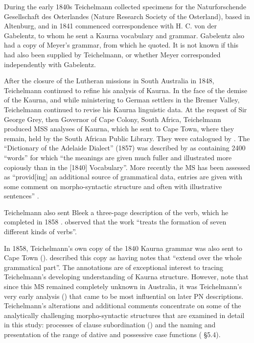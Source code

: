 During the early 1840s Teichelmann collected specimens for the Na\-tur\-for\-schen\-de Gesellschaft des Osterlandes (Nature Research Society of the Osterland), based in Altenburg, and in 1841 commenced correspondence with H. C. von der Gabelentz, to whom he sent a Kaurna vocabulary and grammar. Gabelentz also had a copy of Meyer’s grammar, from which he quoted. It is not known if this had also been supplied by Teichelmann, or whether Meyer corresponded independently with Gabelentz.

After the closure of the Lutheran missions in South Australia in 1848, Teichelmann continued to refine his analysis of Kaurna. In the face of the demise of the Kaurna, and while ministering to German settlers in the Bremer Valley, Teichelmann continued to revise his Kaurna linguistic data. At the request of Sir George Grey, then Governor of Cape Colony, South Africa, Teichelmann produced MSS analyses of Kaurna, which he sent to Cape Town, where they remain, held by the South African Public Library. They were catalogued by \citet[40]{bleek_library_1858}. The “Dictionary of the Adelaide Dialect” (1857) was described by \citet[40]{bleek_library_1858} as containing 2400 “words” for which “the meanings are given much fuller and illustrated more copiously than in the [1840] Vocabulary”. More recently the MS has been assessed as ``provid[ing] an additional source of grammatical data, entries are given with some comment on morpho-syntactic structure and often with illustrative sentences'' \citep[411--12]{simpson_notes_1992}. 

Teichelmann also sent Bleek a three-page description of the verb, which he completed in 1858 \citep{teichelmann_verb_1858}. \citet[40]{bleek_library_1858} observed that the work “treats the formation of seven different kinds of verbs”.

In 1858, Teichelmann’s own copy of the 1840 Kaurna grammar was also sent to Cape Town (\citeyear{teichelmann_verb_1858}). \citet[40]{bleek_library_1858} described this copy as having notes that “extend over the whole grammatical part”. The annotations are of exceptional interest to tracing Teichelmann’s developing understanding of Kaurna structure. However, note that since this MS remained completely unknown in Australia, it was Teichelmann’s very early analysis (\citeyear{teichelmann_outlines_1840}) that came to be most influential on later PN descriptions. Teichelmann’s alterations and additional comments concentrate on some of the analytically challenging morpho-syntactic structures that are examined in detail in this study: processes of clause subordination () and the naming and presentation of the range of dative and possessive case functions (\citealt{stockigt_2017} §5.4).

